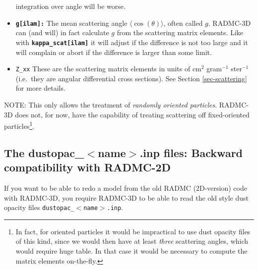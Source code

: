 \documentclass{report}
\begin{document}
\begin{itemize}
  integration over angle will be worse.
\item[] {\small\tt\bf g[ilam]:} The mean scattering angle
  $\langle\cos(\theta)\rangle$, often called $g$. RADMC-3D can (and will) in
  fact calculate $g$ from the scattering matrix elements. Like with
  {\small\tt\bf kappa\_scat[ilam]} it will adjust if the difference is not
  too large and it will complain or abort if the difference is larger than
  some limit.
\item[] {\small\tt Z\_{xx}} These are the scattering matrix elements
  in units of cm$^2$ gram$^{-1}$ ster$^{-1}$ (i.e.\ they are angular
  differential cross sections). See Section \ref{sec-scattering} for
  more details.
\end{itemize}

NOTE: This only allows the treatment of {\em randomly oriented
  particles}. RADMC-3D does not, for now, have the capability of treating
scattering off fixed-oriented particles\footnote{In fact, for oriented
  particles it would be impractical to use dust opacity files of this kind,
  since we would then have at least {\em three} scattering angles, which
  would require huge table. In that case it would be necessary to compute
  the matrix elements on-the-fly.}.

\subsection{The dustopac\_$<$name$>$.inp files: Backward compatibility with RADMC-2D}
\label{sec-dustopac-oldstyle}
If you want to be able to redo a model from the old RADMC (2D-version) code
with RADMC-3D, you require RADMC-3D to be able to read the old style 
dust opacity files {\small\tt dustopac\_$<$name$>$.inp}.
\end{document}
